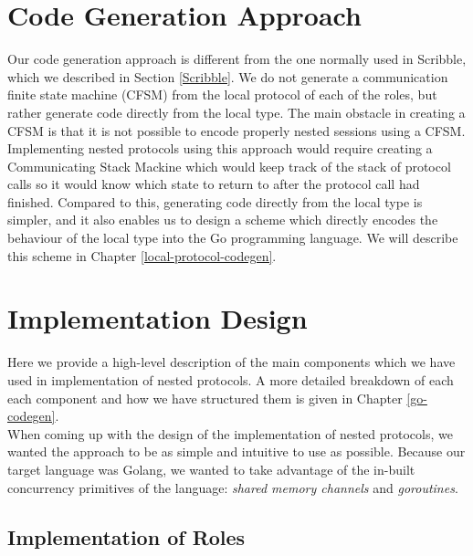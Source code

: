 \documentclass[12pt,twoside]{report}
\begin{document}


\section{Code Generation Approach}\label{codegen-approach}
Our code generation approach is different from the one normally used in Scribble, which we described in Section \ref{Scribble}. We do not generate a communication finite state machine (CFSM) from the local protocol of each of the roles, but rather generate code directly from the local type. The main obstacle in creating a CFSM is that it is not possible to encode properly nested sessions using a CFSM. Implementing nested protocols using this approach would require creating a Communicating Stack Mackine which would keep track of the stack of protocol calls so it would know which state to return to after the protocol call had finished. Compared to this, generating code directly from the local type is simpler, and it also enables us to design a scheme which directly encodes the behaviour of the local type into the Go programming language. We will describe this scheme in Chapter \ref{local-protocol-codegen}.

\section{Implementation Design}\label{design-overview}
Here we provide a high-level description of the main components which we have used in implementation of nested protocols. A more detailed breakdown of each each component and how we have structured them is given in Chapter \ref{go-codegen}. \\

When coming up with the design of the implementation of nested protocols, we wanted the approach to be as simple and intuitive to use as possible. Because our target language was Golang, we wanted to take advantage of the in-built concurrency primitives of the language: \textit{shared memory channels} and \textit{goroutines}.

\subsection{Implementation of Roles}
\end{document}
